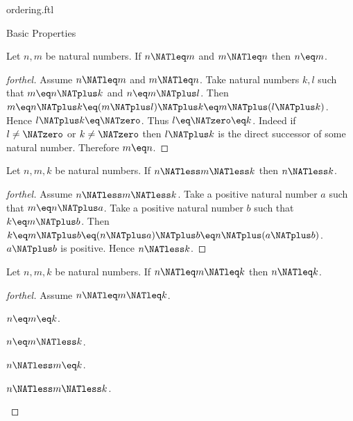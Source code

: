 \documentclass{naproche-library}
\begin{document}
\begin{smodule}[title=The Standard Ordering of the Natural Numbers]{ordering.ftl}
\begin{sfragment}{Basic Properties}
  \begin{proposition}[forthel,id=ARITHMETIC_04_4190604718243840]
    Let $n, m$ be natural numbers.
    If $n \NATleq m$ and $m \NATleq n$ then $n \eq m$.
  \end{proposition}
  \begin{proof}[forthel]
    Assume $n \NATleq m$ and $m \NATleq n$.
    Take natural numbers $k, l$ such that $m \eq n \NATplus k$ and $n \eq m \NATplus l$.
    Then $m
      \eq n \NATplus k
      \eq (m \NATplus l) \NATplus k
      \eq m \NATplus (l \NATplus k)$.
    Hence $l \NATplus k \eq \NATzero$.
    Thus $l \eq \NATzero \eq k$.
    Indeed if $l \neq \NATzero$ or $k \neq \NATzero$ then $l \NATplus k$ is the direct successor of
    some natural number.
    Therefore $m \eq n$.
  \end{proof}

  \begin{proposition}[forthel,id=ARITHMETIC_04_6413905244979200]
    Let $n, m, k$ be natural numbers.
    If $n \NATless m \NATless k$ then $n \NATless k$.
  \end{proposition}
  \begin{proof}[forthel]
    Assume $n \NATless m \NATless k$.
    Take a positive natural number $a$ such that $m \eq n \NATplus a$.
    Take a positive natural number $b$ such that $k \eq m \NATplus b$.
    Then $k
      \eq m \NATplus b
      \eq (n \NATplus a) \NATplus b
      \eq n \NATplus (a \NATplus b)$.
    $a \NATplus b$ is positive.
    Hence $n \NATless k$.
  \end{proof}

  \begin{proposition}[forthel,id=ARITHMETIC_04_5480385953660928]
    Let $n, m, k$ be natural numbers.
    If $n \NATleq m \NATleq k$ then $n \NATleq k$.
  \end{proposition}
  \begin{proof}[forthel]
    Assume $n \NATleq m \NATleq k$.
    \begin{case}{$n \eq m \eq k$.} \end{case}
    \begin{case}{$n \eq m \NATless k$.} \end{case}
    \begin{case}{$n \NATless m \eq k$.} \end{case}
    \begin{case}{$n \NATless m \NATless k$.} \end{case}
  \end{proof}


\end{sfragment}
\end{smodule}
\end{document}
